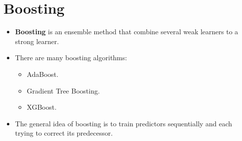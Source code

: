 \documentclass{article}
\begin{document}
	\section{Boosting}
	\begin{itemize}
		\item \textbf{Boosting} is an ensemble method that combine several weak learners to a strong learner.
		\item There are many boosting algorithms:
			\begin{itemize}
				\item AdaBoost.
				\item Gradient Tree Boosting.
				\item XGBoost.
    		\end{itemize}
    	\item The general idea of boosting is to train predictors sequentially and each trying to correct its predecessor.
   	\end{itemize}
\end{document}
